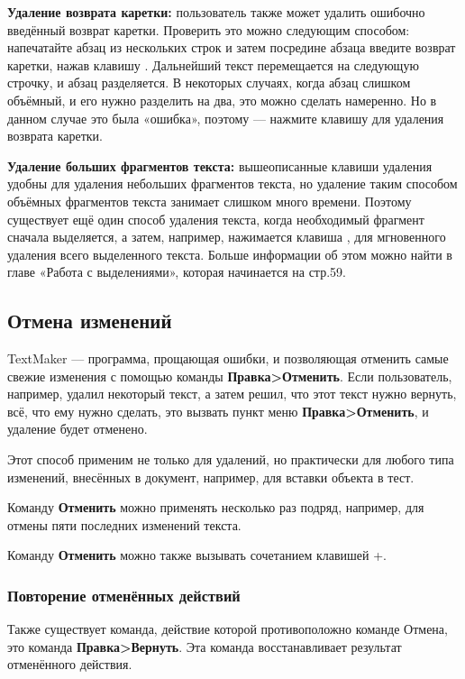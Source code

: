\documentclass[a4paper,10pt]{article}
\begin{document}
\textbf{Удаление возврата каретки:} пользователь также может удалить ошибочно введённый возврат каретки. Проверить это можно следующим способом: напечатайте абзац из нескольких строк и затем посредине абзаца введите возврат каретки, нажав клавишу . Дальнейший текст перемещается на следующую строчку, и абзац разделяется. В некоторых случаях, когда абзац слишком объёмный, и его нужно  разделить на два, это можно сделать намеренно. Но в данном случае это была «ошибка», поэтому --- нажмите клавишу  для удаления возврата каретки.

\textbf{Удаление больших фрагментов текста:} вышеописанные клавиши удаления удобны для удаления небольших фрагментов текста, но удаление таким способом объёмных фрагментов текста занимает слишком много времени. Поэтому существует ещё один способ удаления текста, когда необходимый фрагмент сначала выделяется, а затем, например, нажимается клавиша , для мгновенного удаления всего выделенного текста. Больше информации об этом можно найти в главе «Работа с выделениями», которая начинается на стр.59.

\subsection{Отмена изменений}
TextMaker --- программа, прощающая ошибки, и позволяющая отменить самые свежие изменения с помощью команды \textbf{Правка>Отменить}. Если пользователь, например, удалил некоторый текст, а затем решил, что этот текст нужно вернуть, всё, что ему нужно сделать, это вызвать пункт меню \textbf{Правка>Отменить}, и удаление будет отменено.

Этот способ применим не только для удалений, но практически для любого типа изменений, внесённых в документ, например, для вставки объекта в тест.

Команду \textbf{Отменить} можно применять несколько раз подряд, например, для отмены пяти последних изменений текста.

Команду \textbf{Отменить} можно также вызывать сочетанием клавишей +.

\subsubsection{Повторение отменённых действий}
Также существует команда, действие которой противоположно команде Отмена, это команда \textbf{Правка>Вернуть}. Эта команда восстанавливает результат отменённого действия.
\end{document}
